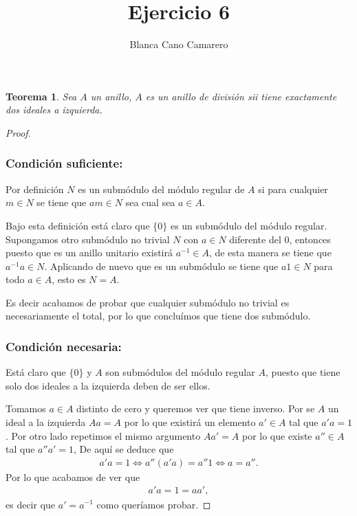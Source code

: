 \documentclass{article}
\title{Ejercicio 6}
\author{Blanca Cano Camarero}
\newtheorem*{teorema*}{Teorema}
\begin{document}
\maketitle

\begin{teorema*}
    Sea $A$ un anillo, $A$ es un anillo de división sii tiene exactamente dos ideales a izquierda. 
\end{teorema*}   
\begin{proof}
 

\subsubsection*{Condición suficiente:}

Por definición $N$ es un submódulo del módulo regular de $A$ si 
para cualquier $m\in N$ se tiene que $am \in N$ sea cual sea $a \in A$. 

Bajo esta definición está claro que $\{0\}$ es un submódulo del módulo regular. Supongamos otro submódulo no trivial $N$
con $a \in N$ diferente del $0$, entonces puesto que es un anillo unitario  existirá $a^{-1} \in A$, de esta manera se tiene que 
$a^{-1} a \in N.$
Aplicando de nuevo que es un submódulo se tiene que 
$a 1 \in N$ para todo $a \in A$, esto es $N=A$. 

Es decir acabamos de probar que cualquier submódulo no trivial es necesariamente el total, por lo que concluímos que tiene dos submódulo. 

\subsubsection*{Condición necesaria:} 

Está claro que $\{0\}$ y $A$ son submódulos del módulo regular $A$, 
puesto que tiene solo dos ideales a la izquierda deben de ser ellos.  

Tomamos $a \in A$ distinto de cero y queremos ver que tiene inverso. Por se $A$ 
un ideal a la izquierda 
$Aa = A$ por lo que existirá un elemento $a' \in A$ tal que 
$a' a = 1$. 
Por otro lado repetimos el mismo argumento $Aa' = A$ por lo que 
existe $a'' \in A$ tal que $a''a' = 1$,
De aquí se deduce que 
\begin{align*}
    a'a = 1 
    \Leftrightarrow  
    a''(a'a) = a''1
    \Leftrightarrow 
    a = a''.
\end{align*}
Por lo que acabamos de ver que 
\begin{align*}
    a'a = 1 = aa',
\end{align*}
es decir que $a' = a^{-1}$ como queríamos probar. 
\end{proof}
\end{document}
